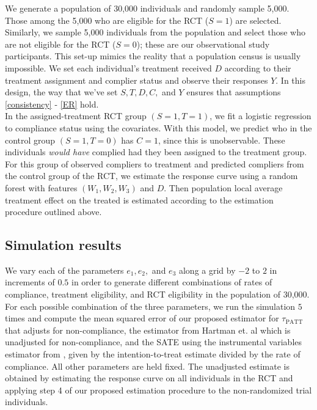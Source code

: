 \documentclass[12pt]{article}
\begin{document}
 We generate a population of 30,000 individuals and randomly sample 5,000.  Those among the 5,000 who are eligible for the RCT ($S=1$) are selected. Similarly, we sample 5,000 individuals from the population and select those who are not eligible for the RCT ($S=0$); these are our observational study participants. This set-up mimics the reality that a population census is usually impossible. We set each individual's treatment received $D$ according to their treatment assignment and complier status and observe their responses $Y$.  In this design, the way that we've set $S, T, D, C,$ and $Y$ ensures that assumptions \eqref{consistency} - \eqref{ER} hold.\\
 
In the assigned-treatment RCT group $(S = 1, T = 1)$, we fit a logistic regression to compliance status using the covariates.  With this model, we predict who in the control group $(S = 1, T = 0)$ has $C=1$, since this is unobservable.  These individuals \textit{would have} complied had they been assigned to the treatment group.  For this group of observed compliers to treatment and predicted compliers from the control group of the RCT, we estimate the response curve using a random forest with features $(W_1, W_2, W_3)$ and $D$.  Then population local average treatment effect on the treated is estimated according to the estimation procedure outlined above.


\subsection{Simulation results}

We vary each of the parameters $e_1, e_2,$ and $e_3$ along a grid by $-2$ to $2$ in increments of $0.5$ in order to generate different combinations of rates of compliance, treatment eligibility, and RCT eligibility in the population of 30,000.  For each possible combination of the three parameters, we run the simulation $5$ times and compute the mean squared error of our proposed estimator for $\tau_{\text{PATT}}$ that adjusts for non-compliance, the estimator from Hartman et. al which is unadjusted for non-compliance, and the SATE using the instrumental variables estimator from \cite{Angrist1996}, given by the intention-to-treat estimate divided by the rate of compliance.  All other parameters are held fixed. The unadjusted estimate is obtained by estimating the response curve on all individuals in the RCT and applying step 4 of our proposed estimation procedure to the non-randomized trial individuals. \\
\end{document}
